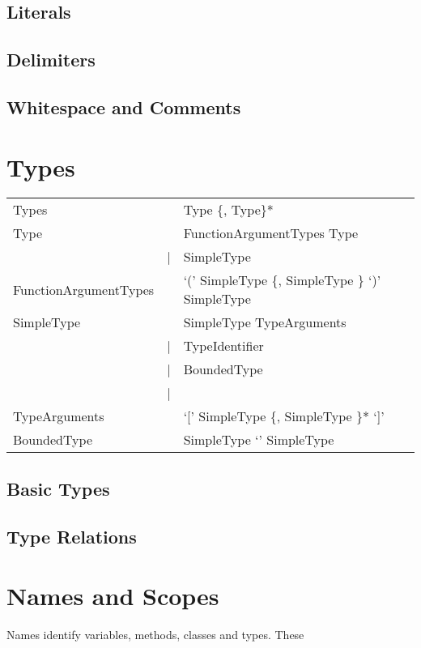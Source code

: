 \section{Literals}

\section{Delimiters}

\section{Whitespace and Comments}


\chapter{Types}
\begin{listing}
	\begin{tabular}[H]{lrl}
		Types & \lra & Type \{, Type\}* \\
		Type & \lra & FunctionArgumentTypes \ra Type\\
				& | & SimpleType \\
		FunctionArgumentTypes & \lra & `(' SimpleType \{, SimpleType \} `)' \ra SimpleType \\
		SimpleType & \lra & SimpleType TypeArguments \\
								& | & TypeIdentifier \\
								& | & BoundedType \\
								& | & \mytype \\
		TypeArguments &\lra & `[' SimpleType \{, SimpleType \}* `]' \\
		BoundedType & \lra & SimpleType `\match' SimpleType \\
	\end{tabular}
\end{listing}


\section{Basic Types}
\section{Type Relations}

\chapter{Names and Scopes}
Names identify variables, methods, classes and types. These 

